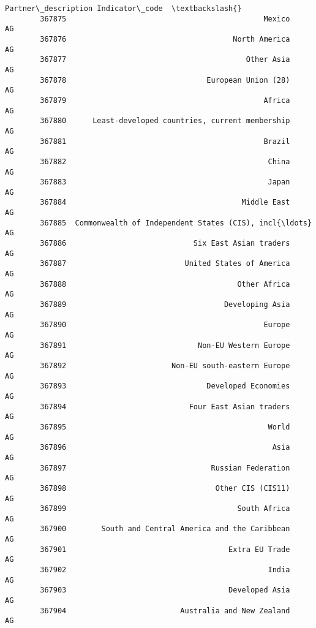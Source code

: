 \documentclass[11pt]{article}
\begin{document}
\begin{Verbatim}[commandchars=\\\{\}]
                                              Partner\_description Indicator\_code  \textbackslash{}
        367875                                             Mexico       AG         
        367876                                      North America       AG         
        367877                                         Other Asia       AG         
        367878                                European Union (28)       AG         
        367879                                             Africa       AG         
        367880      Least-developed countries, current membership       AG         
        367881                                             Brazil       AG         
        367882                                              China       AG         
        367883                                              Japan       AG         
        367884                                        Middle East       AG         
        367885  Commonwealth of Independent States (CIS), incl{\ldots}       AG         
        367886                             Six East Asian traders       AG         
        367887                           United States of America       AG         
        367888                                       Other Africa       AG         
        367889                                    Developing Asia       AG         
        367890                                             Europe       AG         
        367891                              Non-EU Western Europe       AG         
        367892                        Non-EU south-eastern Europe       AG         
        367893                                Developed Economies       AG         
        367894                            Four East Asian traders       AG         
        367895                                              World       AG         
        367896                                               Asia       AG         
        367897                                 Russian Federation       AG         
        367898                                  Other CIS (CIS11)       AG         
        367899                                       South Africa       AG         
        367900        South and Central America and the Caribbean       AG         
        367901                                     Extra EU Trade       AG         
        367902                                              India       AG         
        367903                                     Developed Asia       AG         
        367904                          Australia and New Zealand       AG         

\end{Verbatim}
\end{document}
